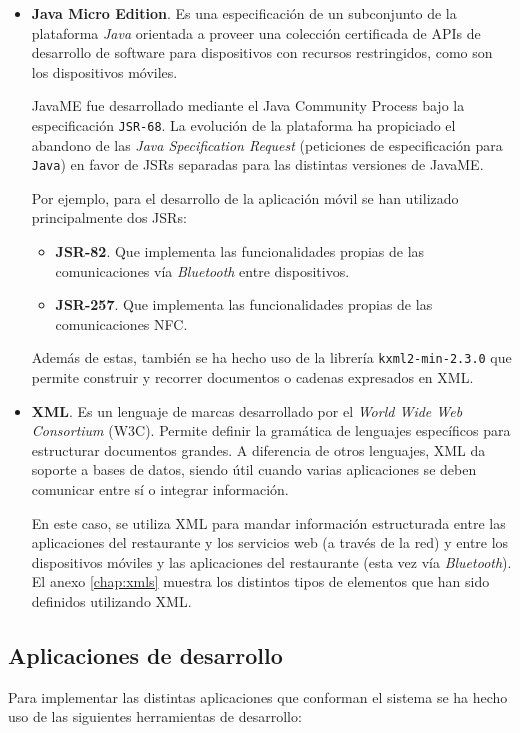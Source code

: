 \begin{itemize}
  \item \textbf{Java Micro Edition}.
  Es una especificación de un subconjunto de la
  plataforma \emph{Java} orientada a proveer una colección certificada de
  \acs{API}s de desarrollo de software para dispositivos con recursos
  restringidos, como son los dispositivos móviles.

  \acs{JavaME} fue desarrollado mediante el Java Community Process bajo la 
  especificación \texttt{\acs{JSR}-68}. La evolución de la plataforma ha 
  propiciado el abandono de las \emph{Java Specification Request} (peticiones  
  de especificación para \texttt{Java}) en favor de \acs{JSR}s separadas para  
  las distintas versiones de \acs{JavaME}.

  Por ejemplo, para el desarrollo de la aplicación móvil se han utilizado
  principalmente dos \acs{JSR}s:
    \begin{itemize}
    \item \textbf{\acs{JSR}-82}. Que implementa las funcionalidades
    propias de las comunicaciones vía \emph{Bluetooth} entre dispositivos.
    \item \textbf{\acs{JSR}-257}. Que implementa las funcionalidades propias
    de las comunicaciones \acs{NFC}.
    \end{itemize}

  Además de estas, también se ha hecho uso de la librería
  \texttt{kxml2-min-2.3.0} que permite construir y recorrer documentos o 
  cadenas expresados en \acs{XML}.

  \item \textbf{XML}.
  Es un lenguaje de marcas desarrollado por el
  \emph{World Wide Web Consortium} (\acs{W3C}). Permite definir la gramática de
  lenguajes específicos para estructurar documentos grandes. A diferencia de
  otros lenguajes, \acs{XML} da soporte a bases de datos, siendo útil cuando
  varias aplicaciones se deben comunicar entre sí o integrar información.

  En este caso, se utiliza \acs{XML} para mandar información estructurada 
  entre las aplicaciones del restaurante y los servicios web (a través de la
  red) y entre los dispositivos móviles y las aplicaciones del restaurante 
  (esta vez vía \emph{Bluetooth}). El anexo \ref{chap:xmls} muestra los 
  distintos tipos de elementos que han sido definidos utilizando \acs{XML}.
  \end{itemize}

  \subsection{Aplicaciones de desarrollo}
  Para implementar las distintas aplicaciones que conforman el sistema se
  ha hecho uso de las siguientes herramientas de desarrollo:
  
